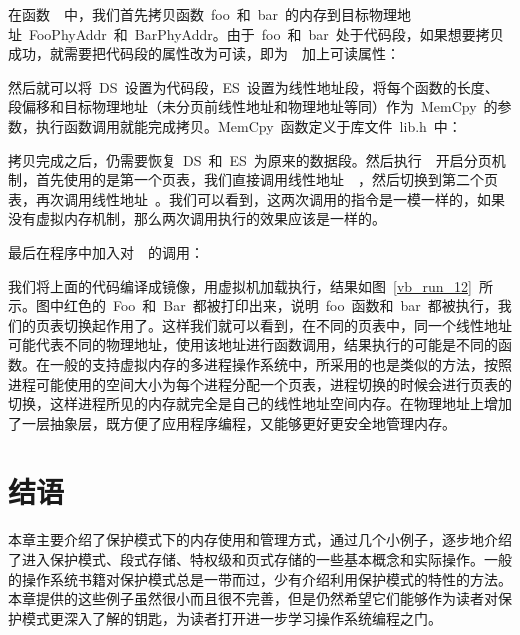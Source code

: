 
在函数~~中，我们首先拷贝函数~foo~和~bar~的内存到目标物理地址~FooPhyAddr~和~BarPhyAddr。由于~foo~和~bar~处于代码段，如果想要拷贝成功，就需要把代码段的属性改为可读，即为~~加上可读属性：


然后就可以将~DS~设置为代码段，ES~设置为线性地址段，将每个函数的长度、段偏移和目标物理地址（未分页前线性地址和物理地址等同）作为~MemCpy~的参数，执行函数调用就能完成拷贝。MemCpy~函数定义于库文件~lib.h~中：


拷贝完成之后，仍需要恢复~DS~和~ES~为原来的数据段。然后执行~~开启分页机制，首先使用的是第一个页表，我们直接调用线性地址~~，然后切换到第二个页表，再次调用线性地址~。我们可以看到，这两次调用的指令是一模一样的，如果没有虚拟内存机制，那么两次调用执行的效果应该是一样的。

最后在程序中加入对~~的调用：



我们将上面的代码编译成镜像，用虚拟机加载执行，结果如图~\ref{vb_run_12}~所示。图中红色的~Foo~和~Bar~都被打印出来，说明~foo~函数和~bar~都被执行，我们的页表切换起作用了。这样我们就可以看到，在不同的页表中，同一个线性地址可能代表不同的物理地址，使用该地址进行函数调用，结果执行的可能是不同的函数。在一般的支持虚拟内存的多进程操作系统中，所采用的也是类似的方法，按照进程可能使用的空间大小为每个进程分配一个页表，进程切换的时候会进行页表的切换，这样进程所见的内存就完全是自己的线性地址空间内存。在物理地址上增加了一层抽象层，既方便了应用程序编程，又能够更好更安全地管理内存。

\section{结语}

本章主要介绍了保护模式下的内存使用和管理方式，通过几个小例子，逐步地介绍了进入保护模式、段式存储、特权级和页式存储的一些基本概念和实际操作。一般的操作系统书籍对保护模式总是一带而过，少有介绍利用保护模式的特性的方法。本章提供的这些例子虽然很小而且很不完善，但是仍然希望它们能够作为读者对保护模式更深入了解的钥匙，为读者打开进一步学习操作系统编程之门。